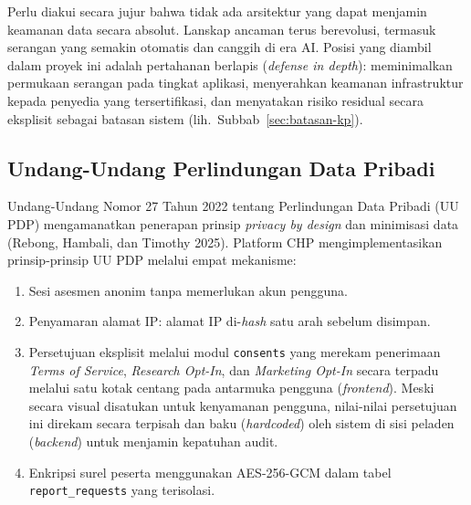Perlu diakui secara jujur bahwa tidak ada arsitektur yang dapat menjamin keamanan data secara absolut. Lanskap ancaman terus berevolusi, termasuk serangan yang semakin otomatis dan canggih di era AI. Posisi yang diambil dalam proyek ini adalah pertahanan berlapis (\textit{defense in depth}): meminimalkan permukaan serangan pada tingkat aplikasi, menyerahkan keamanan infrastruktur kepada penyedia yang tersertifikasi, dan menyatakan risiko residual secara eksplisit sebagai batasan sistem (lih.\ Subbab~\ref{sec:batasan-kp}).

\subsection{Undang-Undang Perlindungan Data Pribadi}
\label{subsec:uu-pdp}

Undang-Undang Nomor 27 Tahun 2022 tentang Perlindungan Data Pribadi (UU PDP) mengamanatkan penerapan prinsip \textit{privacy by design} dan minimisasi data (Rebong, Hambali, dan Timothy 2025). Platform CHP mengimplementasikan prinsip-prinsip UU PDP melalui empat mekanisme:

\begin{enumerate}[leftmargin=2cm]
  \item Sesi asesmen anonim tanpa memerlukan akun pengguna.
  \item Penyamaran alamat IP: alamat IP di-\textit{hash} satu arah sebelum disimpan.
  \item Persetujuan eksplisit melalui modul \texttt{consents} yang merekam penerimaan \textit{Terms of Service}, \textit{Research Opt-In}, dan \textit{Marketing Opt-In} secara terpadu melalui satu kotak centang pada antarmuka pengguna (\textit{frontend}). Meski secara visual disatukan untuk kenyamanan pengguna, nilai-nilai persetujuan ini direkam secara terpisah dan baku (\textit{hardcoded}) oleh sistem di sisi peladen (\textit{backend}) untuk menjamin kepatuhan audit.
  \item Enkripsi surel peserta menggunakan AES-256-GCM dalam tabel \texttt{report\_requests} yang terisolasi.
\end{enumerate}
